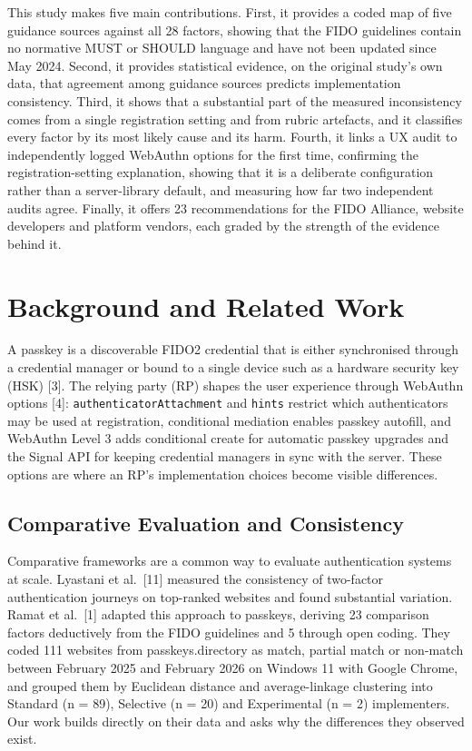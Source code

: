 \documentclass[letterpaper,twocolumn,10pt]{article}
\begin{document}
This study makes five main contributions. First, it provides a coded map of five guidance sources against all 28 factors, showing that the FIDO guidelines contain no normative MUST or SHOULD language and have not been updated since May 2024. Second, it provides statistical evidence, on the original study's own data, that agreement among guidance sources predicts implementation consistency. Third, it shows that a substantial part of the measured inconsistency comes from a single registration setting and from rubric artefacts, and it classifies every factor by its most likely cause and its harm. Fourth, it links a UX audit to independently logged WebAuthn options for the first time, confirming the registration-setting explanation, showing that it is a deliberate configuration rather than a server-library default, and measuring how far two independent audits agree. Finally, it offers 23 recommendations for the FIDO Alliance, website developers and platform vendors, each graded by the strength of the evidence behind it.

\section{Background and Related Work}

A passkey is a discoverable FIDO2 credential that is either synchronised through a credential manager or bound to a single device such as a hardware security key (HSK) {[}3{]}. The relying party (RP) shapes the user experience through WebAuthn options {[}4{]}: \texttt{authenticatorAttachment} and \texttt{hints} restrict which authenticators may be used at registration, conditional mediation enables passkey autofill, and WebAuthn Level 3 adds conditional create for automatic passkey upgrades and the Signal API for keeping credential managers in sync with the server. These options are where an RP's implementation choices become visible differences.

\subsection{Comparative Evaluation and Consistency}

Comparative frameworks are a common way to evaluate authentication systems at scale. Lyastani et al.~{[}11{]} measured the consistency of two-factor authentication journeys on top-ranked websites and found substantial variation. Ramat et al.~{[}1{]} adapted this approach to passkeys, deriving 23 comparison factors deductively from the FIDO guidelines and 5 through open coding. They coded 111 websites from passkeys.directory as match, partial match or non-match between February 2025 and February 2026 on Windows 11 with Google Chrome, and grouped them by Euclidean distance and average-linkage clustering into Standard (n = 89), Selective (n = 20) and Experimental (n = 2) implementers. Our work builds directly on their data and asks why the differences they observed exist.
\end{document}
